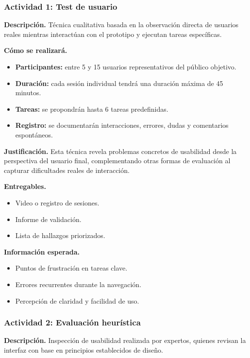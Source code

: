 \documentclass[12pt,letterpaper]{article}
\begin{document}
\subsubsection{Actividad 1: Test de usuario}

\textbf{Descripción.} Técnica cualitativa basada en la observación directa de usuarios reales mientras interactúan con el prototipo y ejecutan tareas específicas.

\textbf{Cómo se realizará.}
\begin{itemize}
    \item \textbf{Participantes:} entre 5 y 15 usuarios representativos del público objetivo.
    \item \textbf{Duración:} cada sesión individual tendrá una duración máxima de 45 minutos.
    \item \textbf{Tareas:} se propondrán hasta 6 tareas predefinidas.
    \item \textbf{Registro:} se documentarán interacciones, errores, dudas y comentarios espontáneos.
\end{itemize}

\textbf{Justificación.} Esta técnica revela problemas concretos de usabilidad desde la perspectiva del usuario final, complementando otras formas de evaluación al capturar dificultades reales de interacción.

\textbf{Entregables.}
\begin{itemize}
    \item Video o registro de sesiones.
    \item Informe de validación.
    \item Lista de hallazgos priorizados.
\end{itemize}

\textbf{Información esperada.}
\begin{itemize}
    \item Puntos de frustración en tareas clave.
    \item Errores recurrentes durante la navegación.
    \item Percepción de claridad y facilidad de uso.
\end{itemize}

\subsubsection{Actividad 2: Evaluación heurística}

\textbf{Descripción.} Inspección de usabilidad realizada por expertos, quienes revisan la interfaz con base en principios establecidos de diseño.
\end{document}
